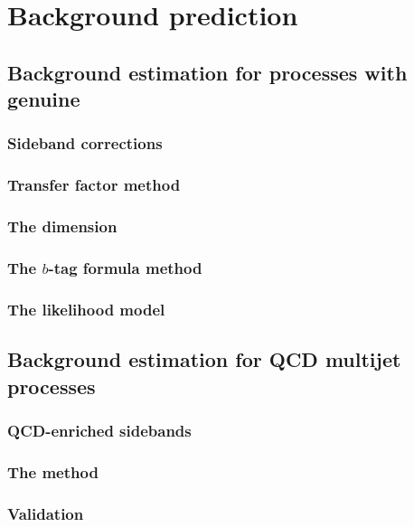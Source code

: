 \chapter{Background prediction} %
\label{chap:backgroundPred}

\section{Background estimation for processes with genuine \MET}

\subsection{Sideband corrections}

\subsection{Transfer factor method}

\subsection{The \MHT dimension} %

\subsection{The $b$-tag formula method}

\subsection{The likelihood model} %

\section{Background estimation for QCD multijet processes} %

\subsection{QCD-enriched sidebands}

\subsection{The method}

\subsection{Validation} %

